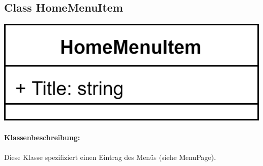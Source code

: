 \documentclass[a4paper,12pt]{article}
\begin{document}
\begin{minipage}[b]{0.7\textwidth}

	\subsection{Class HomeMenuItem}
\end{minipage}
\begin{minipage}[c]{0.3\textwidth}
	\includegraphics[width=\textwidth]{bilder/ViewmodelKlassen/HomeMenuItem.png}
\end{minipage}
	\paragraph{Klassenbeschreibung:}
	Diese Klasse spezifiziert einen Eintrag des Menüs (siehe MenuPage). 
\end{document}
